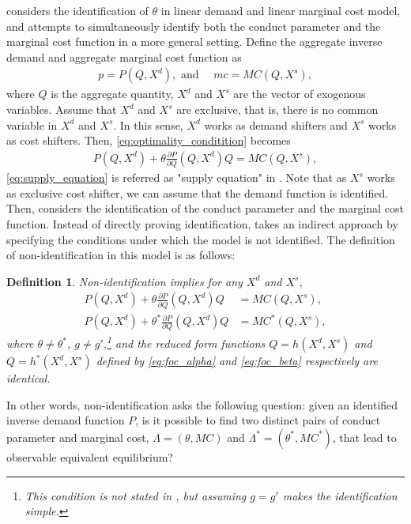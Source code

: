 \documentclass[11pt, a4paper]{article}
\newtheorem{definition}{Definition}
\theoremstyle{remark}
\begin{document}
\cite{bresnahan1982oligopoly} considers the identification of $\theta$ in linear demand and linear marginal cost model, and \citet{lau1982identifying} attempts to simultaneously identify both the conduct parameter and the marginal cost function in a more general setting.
Define the aggregate inverse demand and aggregate marginal cost function as
\begin{align}
    p = P(Q, X^{d}),\text{ and } \quad mc = MC(Q, X^{s}),
\end{align}
where $Q$ is the aggregate quantity, $X^{d}$ and $X^{s}$ are the vector of exogenous variables.
Assume that $X^{d}$ and $X^{s}$ are exclusive, that is, there is no common variable in $X^{d}$ and $X^{s}$.
In this sense, $X^{d}$ works as demand shifters and $X^{s}$ works as cost shifters. 
Then, \eqref{eq:optimality_conditition} becomes
\begin{align}
     P(Q,X^{d}) + \theta\frac{\partial P}{\partial Q}(Q, X^{d})Q = MC(Q, X^{s}),\label{eq:supply_equation}
\end{align}
\eqref{eq:supply_equation} is referred as "supply equation" in \citet{bresnahan1982oligopoly}.
Note that as $X^{s}$ works as exclusive cost shifter, we can assume that the demand function is identified.
Then, \citet{lau1982identifying} considers the identification of the conduct parameter and the marginal cost function. 
Instead of directly proving identification, \citet{lau1982identifying} takes an indirect approach by specifying the conditions under which the model is not identified. 
The definition of non-identification in this model is as follows:

\begin{framed}
    \begin{definition}\label{def:non_identification}
    Non-identification implies for any $X^{d}$ and $X^{s}$,
    \begin{align}
    P(Q, X^{d}) + \theta \frac{\partial P}{\partial Q}(Q, X^{d})Q &= MC(Q, X^{s}),  \label{eq:foc_alpha}\\
    P(Q, X^{d}) + \theta^{*} \frac{\partial P}{\partial Q}(Q, X^{d})Q &= MC^{*}(Q, X^{s}),\label{eq:foc_beta}
    \end{align}
    where $\theta \neq \theta^{*}$, $g \ne g'$,\footnote{This condition is not stated in \citet{lau1982identifying}, but assuming $g = g'$ makes the identification simple.} and the reduced form functions $Q = h(X^{d}, X^{s})$ and $Q = h^{*}(X^{d}, X^{s})$ defined by \eqref{eq:foc_alpha} and \eqref{eq:foc_beta} respectively are identical.
    \end{definition}
\end{framed}
In other words, non-identification asks the following question: given an identified inverse demand function $P$, is it possible to find two distinct pairs of conduct parameter and marginal cost, $\Lambda = (\theta, MC)$ and $\Lambda^{*} = (\theta^{*}, MC^{*})$, that lead to observable equivalent equilibrium?
\end{document}
